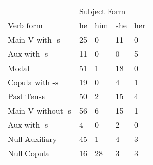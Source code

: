 \begin{table}[]
\begin{minipage}{0.5\textwidth}
\end{minipage}
\begin{minipage}{0.5\textwidth}
    \centering
    \begin{tabular}{@{}lllll@{}}
        \toprule
            &\multicolumn{4}{l}{Subject Form}\\
            \cline{2-5}
        Verb form & he & him & she & her \\
        \midrule
        Main V with -s & 25 & 0 & 11 & 0 \\
        Aux with -s & 11 & 0 & 0 & 5 \\
        Modal & 51 & 1 & 18 & 0 \\
        Copula with -s & 19 & 0 & 4 & 1 \\
        Past Tense & 50 & 2 & 15 & 4 \\
        \hline
        Main V without -s & 56 & 6 & 15 & 1 \\
        Aux with -s & 4 & 0 & 2 & 0 \\
        Null Auxiliary & 45 & 1 & 4 & 3 \\
        Null Copula & 16 & 28 & 3 & 3 \\
        \bottomrule
    \end{tabular}
    \end{minipage}
\end{table}
